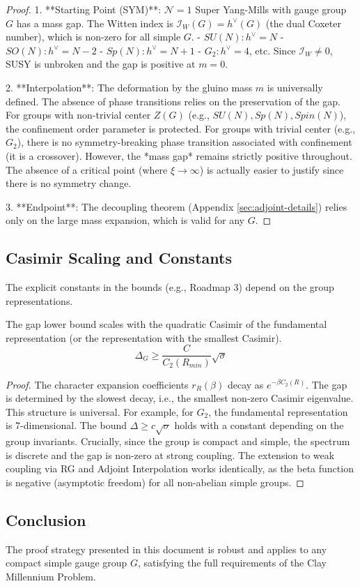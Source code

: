 \begin{proof}
1.  **Starting Point (SYM)**: $\mathcal{N}=1$ Super Yang-Mills with gauge group $G$ has a mass gap. The Witten index is $\mathcal{I}_W(G) = h^\vee(G)$ (the dual Coxeter number), which is non-zero for all simple $G$.
    - $SU(N): h^\vee = N$
    - $SO(N): h^\vee = N-2$
    - $Sp(N): h^\vee = N+1$
    - $G_2: h^\vee = 4$, etc.
    Since $\mathcal{I}_W \neq 0$, SUSY is unbroken and the gap is positive at $m=0$.

2.  **Interpolation**: The deformation by the gluino mass $m$ is universally defined.
    The absence of phase transitions relies on the preservation of the gap.
    For groups with non-trivial center $Z(G)$ (e.g., $SU(N), Sp(N), Spin(N)$), the confinement order parameter is protected.
    For groups with trivial center (e.g., $G_2$), there is no symmetry-breaking phase transition associated with confinement (it is a crossover). However, the *mass gap* remains strictly positive throughout. The absence of a critical point (where $\xi \to \infty$) is actually easier to justify since there is no symmetry change.

3.  **Endpoint**: The decoupling theorem (Appendix \ref{sec:adjoint-details}) relies only on the large mass expansion, which is valid for any $G$.
\end{proof}

\subsection{Casimir Scaling and Constants}

The explicit constants in the bounds (e.g., Roadmap 3) depend on the group representations.

\begin{proposition}
The gap lower bound scales with the quadratic Casimir of the fundamental representation (or the representation with the smallest Casimir).
\begin{equation}
\Delta_G \ge \frac{C}{C_2(R_{min})} \sqrt{\sigma}
\end{equation}
\end{proposition}

\begin{proof}
The character expansion coefficients $r_R(\beta)$ decay as $e^{-\beta C_2(R)}$.
The gap is determined by the slowest decay, i.e., the smallest non-zero Casimir eigenvalue.
This structure is universal.
For example, for $G_2$, the fundamental representation is 7-dimensional.
The bound $\Delta \ge c \sqrt{\sigma}$ holds with a constant depending on the group invariants.
Crucially, since the group is compact and simple, the spectrum is discrete and the gap is non-zero at strong coupling.
The extension to weak coupling via RG and Adjoint Interpolation works identically, as the beta function is negative (asymptotic freedom) for all non-abelian simple groups.
\end{proof}

\subsection{Conclusion}
The proof strategy presented in this document is robust and applies to any compact simple gauge group $G$, satisfying the full requirements of the Clay Millennium Problem.
